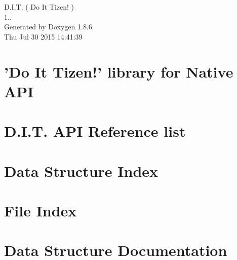 \documentclass[twoside]{book}
\newcommand{\clearemptydoublepage}{%
  \newpage{\pagestyle{empty}\cleardoublepage}%
}
\begin{document}
\begin{titlepage}
\vspace*{7cm}
\begin{center}%
{\Large D.\-I.\-T. ( Do It Tizen! ) \\[1ex]\large 1.. }\\
\vspace*{1cm}
{\large Generated by Doxygen 1.8.6}\\
\vspace*{0.5cm}
{\small Thu Jul 30 2015 14:41:39}\\
\end{center}
\end{titlepage}
\clearemptydoublepage
\tableofcontents
\clearemptydoublepage
{}

\chapter{'Do It Tizen!' library for Native A\-P\-I}
\label{index}
\chapter{D.\-I.\-T. A\-P\-I Reference list}
\label{md__Users_CDJ_Dropbox_DJ_SSM_DIT_doxygen_DIT_API_Reference_list}

\chapter{Data Structure Index}

\chapter{File Index}

\chapter{Data Structure Documentation}





























\end{document}
